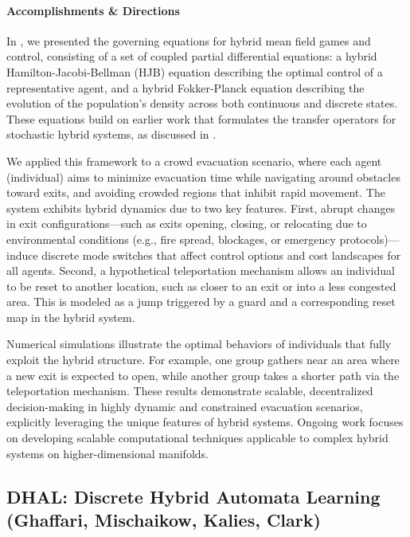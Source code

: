 \documentclass[letterpaper,11pt]{article}
\begin{document}
\paragraph{Accomplishments \& Directions}

In \cite{CLeePISNCS25}, we presented the governing equations for hybrid mean field games and control, consisting of a set of coupled partial differential equations: a hybrid Hamilton-Jacobi-Bellman (HJB) equation describing the optimal control of a representative agent, and a hybrid Fokker-Planck equation describing the evolution of the population’s density across both continuous and discrete states.
These equations build on earlier work that formulates the transfer operators for stochastic hybrid systems, as discussed in .

We applied this framework to a crowd evacuation scenario, where each agent (individual) aims to minimize evacuation time while navigating around obstacles toward exits, and avoiding crowded regions that inhibit rapid movement.
The system exhibits hybrid dynamics due to two key features.
First, abrupt changes in exit configurations—such as exits opening, closing, or relocating due to environmental conditions (e.g., fire spread, blockages, or emergency protocols)—induce discrete mode switches that affect control options and cost landscapes for all agents.
Second, a hypothetical teleportation mechanism allows an individual to be reset to another location, such as closer to an exit or into a less congested area.
This is modeled as a jump triggered by a guard and a corresponding reset map in the hybrid system.

Numerical simulations illustrate the optimal behaviors of individuals that fully exploit the hybrid structure.
For example, one group gathers near an area where a new exit is expected to open, while another group takes a shorter path via the teleportation mechanism.
These results demonstrate scalable, decentralized decision-making in highly dynamic and constrained evacuation scenarios, explicitly leveraging the unique features of hybrid systems.
Ongoing work focuses on developing scalable computational techniques applicable to complex hybrid systems on higher-dimensional manifolds.

\subsection{DHAL: Discrete Hybrid Automata Learning (Ghaffari, Mischaikow, Kalies, Clark)}\label{sec:DHAL}
\end{document}
